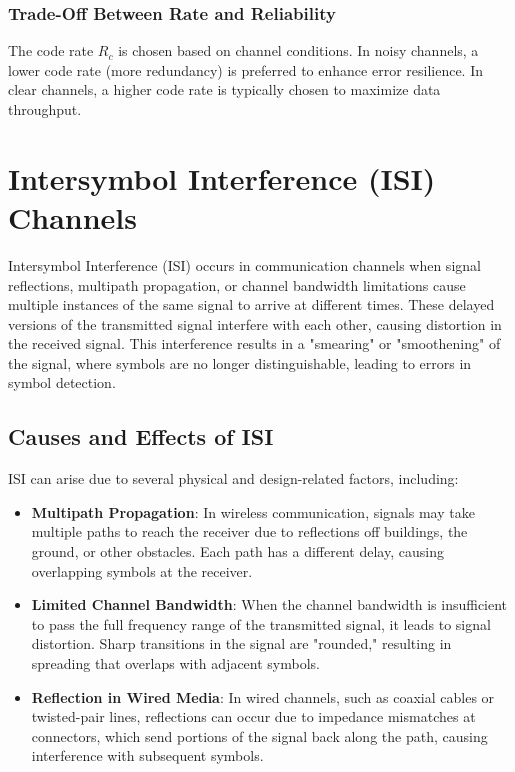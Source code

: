 \documentclass[10pt]{article}
\begin{document}
\subsubsection{Trade-Off Between Rate and Reliability}

The code rate \( R_c \) is chosen based on channel conditions. In noisy channels, a lower code rate (more redundancy) is preferred to enhance error resilience. In clear channels, a higher code rate is typically chosen to maximize data throughput.

\section{Intersymbol Interference (ISI) Channels}
Intersymbol Interference (ISI) occurs in communication channels when signal reflections, multipath propagation, or channel bandwidth limitations cause multiple instances of the same signal to arrive at different times. These delayed versions of the transmitted signal interfere with each other, causing distortion in the received signal. This interference results in a "smearing" or "smoothening" of the signal, where symbols are no longer distinguishable, leading to errors in symbol detection.

\subsection{Causes and Effects of ISI}
ISI can arise due to several physical and design-related factors, including:
\begin{itemize}
    \item \textbf{Multipath Propagation}: In wireless communication, signals may take multiple paths to reach the receiver due to reflections off buildings, the ground, or other obstacles. Each path has a different delay, causing overlapping symbols at the receiver.
    \item \textbf{Limited Channel Bandwidth}: When the channel bandwidth is insufficient to pass the full frequency range of the transmitted signal, it leads to signal distortion. Sharp transitions in the signal are "rounded," resulting in spreading that overlaps with adjacent symbols.
    \item \textbf{Reflection in Wired Media}: In wired channels, such as coaxial cables or twisted-pair lines, reflections can occur due to impedance mismatches at connectors, which send portions of the signal back along the path, causing interference with subsequent symbols.
\end{itemize}
\end{document}
